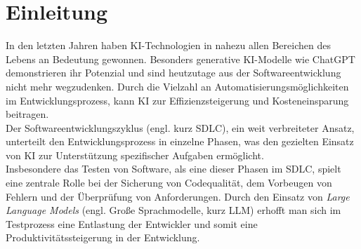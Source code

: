 
\chapter{Einleitung}
In den letzten Jahren haben \acs{KI}-Technologien in nahezu allen Bereichen des Lebens an Bedeutung gewonnen. Besonders generative KI-Modelle wie Chat\acs{GPT} demonstrieren ihr Potenzial und sind heutzutage aus der Softwareentwicklung nicht mehr wegzudenken. \cite{hammermann_ki_nodate} Durch die Vielzahl an Automatisierungsmöglichkeiten im Entwicklungsprozess, kann KI zur Effizienzsteigerung und Kosteneinsparung beitragen.\\ Der Softwareentwicklungszyklus (engl. kurz \acs{SDLC}), ein weit verbreiteter Ansatz, unterteilt den Entwicklungsprozess in einzelne Phasen, was den gezielten Einsatz von KI zur Unterstützung spezifischer Aufgaben ermöglicht.\\ Insbesondere das Testen von Software, als eine dieser Phasen im SDLC, spielt eine zentrale Rolle bei der Sicherung von Codequalität, dem Vorbeugen von Fehlern und der Überprüfung von Anforderungen. \cite{noauthor_was_nodate} Durch den Einsatz von \textit{Large Language Models} (engl. Große Sprachmodelle, kurz \acs{LLM}) erhofft man sich im Testprozess eine Entlastung der Entwickler und somit eine Produktivitätssteigerung in der Entwicklung.

